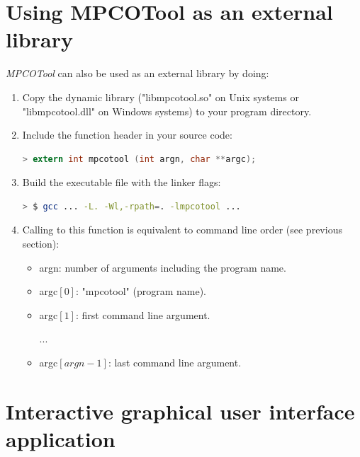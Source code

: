 \documentclass[a4paper]{report}
\begin{document}
\section{Using MPCOTool as an external library}

\emph{MPCOTool} can also be used as an external library by doing:

\begin{enumerate}

\item Copy the dynamic library ("libmpcotool.so" on Unix systems or
"libmpcotool.dll" on Windows systems) to your program directory.

\item Include the function header in your source code:
\begin{lstlisting}[language=c,basicstyle=\scriptsize]
> extern int mpcotool (int argn, char **argc);
\end{lstlisting}

\item Build the executable file with the linker flags:
\begin{lstlisting}[language=bash,basicstyle=\scriptsize]
> $ gcc ... -L. -Wl,-rpath=. -lmpcotool ...
\end{lstlisting}

\item Calling to this function is equivalent to command line order (see previous
section):
	\begin{itemize}
		\item argn: number of arguments including the program name.
		\item argc$[0]$: "mpcotool" (program name).
		\item argc$[1]$: first command line argument.

	  ...

		\item argc$[argn-1]$: last command line argument.
	\end{itemize}
\end{enumerate}

\section{Interactive graphical user interface application}
\end{document}
